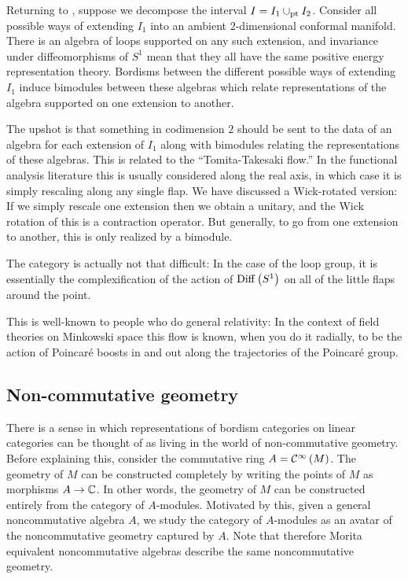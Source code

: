 \begin{ex}
Returning to , suppose we decompose the interval 
$I = I_1 \cup_{\operatorname{pt}} I_2$. Consider all possible ways of extending $I_1$ into an ambient
$2$-dimensional conformal manifold. 
There is an algebra of loops supported on any such extension, 
and invariance under diffeomorphisms of $S^1$ mean that they all have the same positive
energy representation theory. 
Bordisms between the different possible ways of extending $I_1$ induce 
bimodules between these algebras which relate representations of the algebra supported on
one extension to another.

The upshot is that something in codimension $2$ should be sent to the data of 
an algebra for each extension of $I_1$ along with bimodules relating the representations
of these algebras.
This is related to the ``Tomita-Takesaki flow.'' In the functional analysis literature
this is usually considered along the real axis, in which case it is simply rescaling along
any single flap. 
We have discussed a Wick-rotated version: If we simply rescale one extension then we
obtain a unitary, and the Wick rotation of this is a contraction operator. 
But generally, to go from one extension to another, this is only realized by a bimodule.

The category is actually not that difficult: In the case of the loop group, it is
essentially the complexification of the action of $\operatorname{Diff}\left(S^1\right)$ on all of the
little flaps around the point.
\end{ex}

\begin{rmk}
This is well-known to people who do general relativity:
In the context of field theories on Minkowski space this flow is known, when you do it
radially, to be the action of  Poincar\'e boosts in and out along the trajectories of the
Poincar\'e group.
\end{rmk}

\subsection{Non-commutative geometry}

There is a sense in which representations of bordism categories on linear categories can
be thought of as living in the world of non-commutative geometry. 
Before explaining this, consider the commutative ring $A = \mathcal{C}^\infty\left(M\right)$.
The geometry of $M$ can be constructed completely by writing the points of $M$ as
morphisms $A\to \mathbb{C}$. In other words, the geometry of $M$ can be constructed entirely from
the category of $A$-modules.
Motivated by this, given a general noncommutative algebra $A$, we study the category
of $A$-modules as an avatar of the noncommutative geometry captured by $A$. Note that
therefore Morita equivalent noncommutative algebras describe the same noncommutative
geometry.

